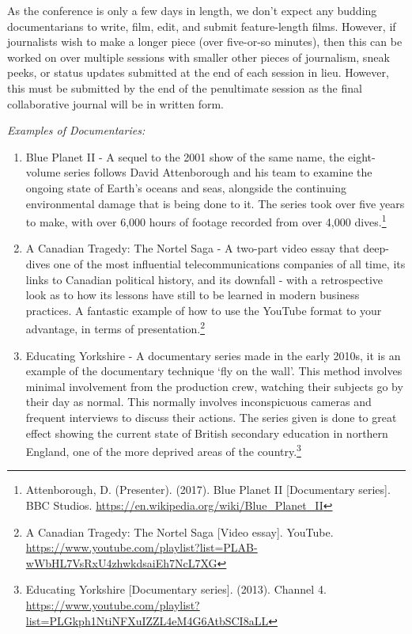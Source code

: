 As the conference is only a few days in length, we don’t expect any budding documentarians to write, film, edit, and submit feature-length films. However, if journalists wish to make a longer piece (over five-or-so minutes), then this can be worked on over multiple sessions with smaller other pieces of journalism, sneak peeks, or status updates submitted at the end of each session in lieu. However, this must be submitted by the end of the penultimate session as the final collaborative journal will be in written form.

\emph{Examples of Documentaries:}

\begin{enumerate}
  \item Blue Planet II - A sequel to the 2001 show of the same name, the eight-volume series follows David Attenborough and his team to examine the ongoing state of Earth’s oceans and seas, alongside the continuing environmental damage that is being done to it. The series took over five years to make, with over 6,000 hours of footage recorded from over 4,000 dives.\footnote{Attenborough, D. (Presenter). (2017). Blue Planet II [Documentary series]. BBC Studios. \url{https://en.wikipedia.org/wiki/Blue_Planet_II}}
  \item A Canadian Tragedy: The Nortel Saga - A two-part video essay that deep-dives one of the most influential telecommunications companies of all time, its links to Canadian political history, and its downfall - with a retrospective look as to how its lessons have still to be learned in modern business practices. A fantastic example of how to use the YouTube format to your advantage, in terms of presentation.\footnote{A Canadian Tragedy: The Nortel Saga [Video essay]. YouTube. \url{https://www.youtube.com/playlist?list=PLAB-wWbHL7VsRxU4zhwkdsaiEh7NcL7XG}}
  \item Educating Yorkshire - A documentary series made in the early 2010s, it is an example of the documentary technique ‘fly on the wall’. This method involves minimal involvement from the production crew, watching their subjects go by their day as normal. This normally involves inconspicuous cameras and frequent interviews to discuss their actions. The series given is done to great effect showing the current state of British secondary education in northern England, one of the more deprived areas of the country.\footnote{Educating Yorkshire [Documentary series]. (2013). Channel 4. \url{https://www.youtube.com/playlist?list=PLGkph1NtiNFXuIZZL4eM4G6AtbSCI8aLL}}
\end{enumerate}

